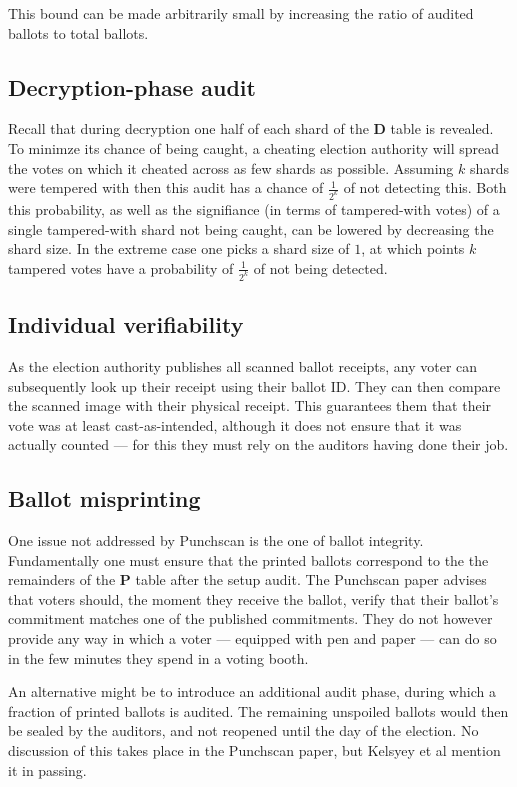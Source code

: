 This bound can be made arbitrarily small by increasing the ratio of audited
ballots to total ballots.

\subsection{Decryption-phase audit}

Recall that during decryption one half of each shard of the \textbf{D} table is
revealed. To minimze its chance of being caught, a cheating election authority
will spread the votes on which it cheated across as few shards as possible.
Assuming $k$ shards were tempered with then this audit has a chance of
$\frac{1}{2^k}$ of not detecting this. Both this probability, as well as the
signifiance (in terms of tampered-with votes) of a single tampered-with shard
not being caught, can be lowered by decreasing the shard size. In the extreme
case one picks a shard size of $1$, at which points $k$ tampered votes have a
probability of $\frac{1}{2^k}$ of not being detected.

\subsection{Individual verifiability}

As the election authority publishes all scanned ballot receipts, any voter can
subsequently look up their receipt using their ballot ID. They can then compare
the scanned image with their physical receipt. This guarantees them that their
vote was at least cast-as-intended, although it does not ensure that it was
actually counted --- for this they must rely on the auditors having done their
job.

\subsection{Ballot misprinting}

One issue not addressed by Punchscan is the one of ballot integrity.
Fundamentally one must ensure that the printed ballots correspond to the the
remainders of the \textbf{P} table after the setup audit. The Punchscan paper
advises that voters should, the moment they receive the ballot, verify that
their ballot's commitment matches one of the published commitments. They do not
however provide any way in which a voter --- equipped with pen and paper ---
can do so in the few minutes they spend in a voting booth.

An alternative might be to introduce an additional audit phase, during which a
fraction of printed ballots is audited. The remaining unspoiled ballots would
then be sealed by the auditors, and not reopened until the day of the election.
No discussion of this takes place in the Punchscan paper, but Kelsyey et
al\autocite{kelseyAttackingPaperBasedE2E2010} mention it in passing.

